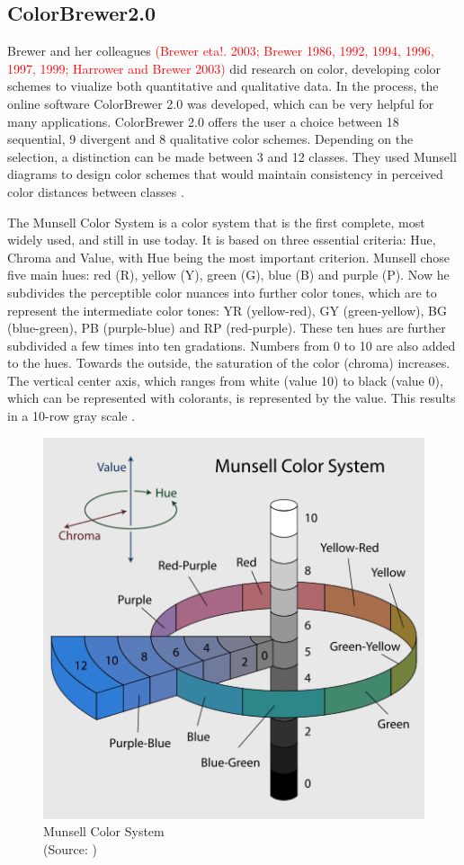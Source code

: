 \subsection{ColorBrewer2.0}
Brewer and her colleagues \textcolor{red}{(Brewer eta!. 2003; Brewer 1986, 1992, 1994, 1996, 1997, 1999; Harrower and Brewer 2003)} did research on color, developing color schemes to viualize both quantitative and qualitative data. In the process, the online software ColorBrewer 2.0 was developed, which can be very helpful for many applications. ColorBrewer 2.0 offers the user a choice between 18 sequential, 9 divergent and 8 qualitative color schemes. Depending on the selection, a distinction can be made between 3 and 12 classes. They used Munsell diagrams to design color schemes that would maintain consistency in perceived color distances between classes \parencite{brychtova2017}. 

The Munsell Color System is a color system that is the first complete, most widely used, and still in use today. It is based on three essential criteria: Hue, Chroma and Value, with Hue being the most important criterion. Munsell chose five main hues: red (R), yellow (Y), green (G), blue (B) and purple (P). Now he subdivides the perceptible color nuances into further color tones, which are to represent the intermediate color tones: YR (yellow-red), GY (green-yellow), BG (blue-green), PB (purple-blue) and RP (red-purple). These ten hues are further subdivided a few times into ten gradations. Numbers from 0 to 10 are also added to the hues. Towards the outside, the saturation of the color (chroma) increases. The vertical center axis, which ranges from white (value 10) to black (value 0), which can be represented with colorants, is represented by the value. This results in a 10-row gray scale \parencite{munsell1915}.

\begin{figure}
	\centering
	\includegraphics[width=0.4\linewidth]{source/images/munsell}
	\caption{Munsell Color System \\
	(Source: \textcite{munsell2007})}
	\label{fig:munsell}
\end{figure}

